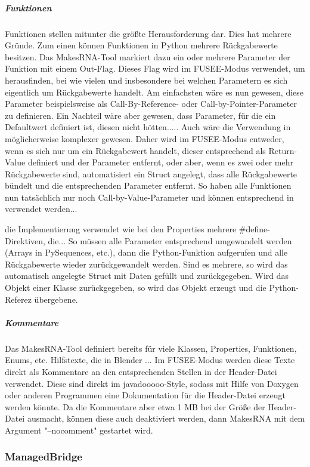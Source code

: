 \subparagraph{Funktionen}

Funktionen stellen mitunter die größte Herausforderung dar. Dies hat mehrere Gründe. Zum einen können Funktionen in Python mehrere Rückgabewerte besitzen. Das MakesRNA-Tool markiert dazu ein oder mehrere Parameter der Funktion mit einem Out-Flag. Dieses Flag wird im FUSEE-Modus verwendet, um herausfinden, bei wie vielen und insbesondere bei welchen Parametern es sich eigentlich um Rückgabewerte handelt. Am einfachsten wäre es nun gewesen, diese Parameter beispielsweise als Call-By-Reference- oder Call-by-Pointer-Parameter zu definieren. Ein Nachteil wäre aber gewesen, dass Parameter, für die ein Defaultwert definiert ist, diesen nicht hötten..... Auch wäre die Verwendung in \CS{} möglicherweise komplexer gewesen. Daher wird im FUSEE-Modus entweder, wenn es sich nur um ein Rückgabewert handelt, dieser entsprechend als Return-Value definiert und der Parameter entfernt, oder aber, wenn es zwei oder mehr Rückgabewerte sind, automatisiert ein Struct angelegt, dass alle Rückgabewerte bündelt und die entsprechenden Parameter entfernt. So haben alle Funktionen nun tatsächlich nur noch Call-by-Value-Parameter und können entsprechend in \CS{} verwendet werden...

die Implementierung verwendet wie bei den Properties mehrere \#define-Direktiven, die... So müssen alle Parameter entsprechend umgewandelt werden (Arrays in PySequences, etc.), dann die Python-Funktion aufgerufen und alle Rückgabewerte wieder zurückgewandelt werden. Sind es mehrere, so wird das automatisch angelegte Struct mit Daten gefüllt und zurückgegeben. Wird das Objekt einer Klasse zurückgegeben, so wird das Objekt erzeugt und die Python-Referez übergebene. 

\subparagraph{Kommentare}

Das MakesRNA-Tool definiert bereits für viele Klassen, Properties, Funktionen, Enums, etc. Hilfstexte, die in Blender ... Im FUSEE-Modus werden diese Texte direkt als Kommentare an den entsprechenden Stellen in der Header-Datei verwendet. Diese sind direkt im javadooooo-Style, sodass mit Hilfe von Doxygen oder anderen Programmen eine Dokumentation für die Header-Datei erzeugt werden könnte. Da die Kommentare aber etwa 1 MB bei der Größe der Header-Datei ausmacht, können diese auch deaktiviert werden, dann MakesRNA mit dem Argument "--nocomment" gestartet wird.

\subsubsection{ManagedBridge}

